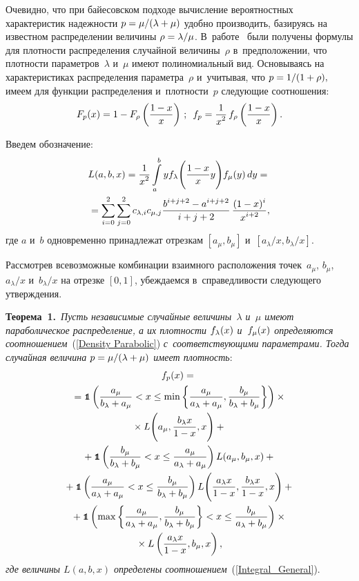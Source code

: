 \begin{multicols}{2}
Очевидно, что при байесовском подходе вы\-чис\-ление вероятностных характеристик 
на\-деж\-ности $p \hm= \mu/{(\lambda+\mu)}$ удобно производить, базируясь на 
известном распределении величины $\rho\hm=\lambda/\mu$. 
В~работе~\cite{K2016} были получены формулы для плотности распределения 
случайной величины~$\rho$ в~предположении, что плотности параметров~$\lambda$ 
и~$\mu$ имеют полиномиальный вид.
Основываясь на характеристиках распределения параметра~$\rho$ и~учитывая, что 
$p \hm=1/(1\hm+\rho),$
имеем для функции распределения и~плот\-ности~$p$ следующие соотношения:
$$
F_p(x)=1-F_\rho\left(\fr{1-x}{x}\right)\,;\enskip 
f_p=\fr{1}{x^2}\,f_\rho\left(\fr{1-x}{x}\right).
$$


Введем обозначение:
\begin{multline}
L(a,b,x)=\fr{1}{x^2} \il{a}{b}{y}\fl\Bigg(\fr{1-x}{x} y\Bigg)\fm(y)\, dy ={}\\
{}=\sum\limits_{i=0}^{2}\sum\limits_{j=0}^{2}c_{\lambda,i}c_{\mu,j}
\fr{b^{i+j+2}-a^{i+j+2}}{i+j+2}\, \fr{(1-x)^i}{x^{i+2}},
\label{Integral_General}
\end{multline}
где $a$ и~$b$ одновременно принадлежат отрезкам $[a_\mu,b_\mu]$ 
и~$[a_\lambda/x,b_\lambda/x]$.

Рассмотрев всевозможные комбинации взаимного расположения точек~$a_\mu$, 
$b_\mu$, $a_\lambda/x$ и~$b_\lambda/x$ на отрезке $[0,1]$, убеждаемся 
в~справедливости следующего утверждения.

\smallskip

\noindent
\textbf{Теорема~1.}\
\textit{Пусть независимые случайные величины~$\lambda$ и~$\mu$ имеют 
параболическое распределение, а их плотности $\fl(x)$ и~$\fm(x)$ 
определяются соотношением}~(\ref{Density Parabolic}) 
\textit{с~соответствующими параметрами.
Тогда случайная величина $p \hm= {{\mu}/{(\lambda+\mu)}}$ имеет плотность}:
\begin{multline*}
f_p(x)={}\\
{}=\Ik\left(\fr{\am}{b_\lambda+\am}<x\le\min\left\{
\fr{\am}{\al+\am},\fr{b_\mu}{b_\lambda+b_\mu}\right\}\right)\times{}\\
{}\times L
\Bigg(\am,\fr{b_\lambda x}{1-x},x\Bigg)+{}\\
{}+\Ik\left(\fr{b_\mu}{b_\lambda+b_\mu}<x\le\fr{\am}{\al+\am}\right)L(\am,b_\mu,x)+{}\\
{}+\Ik\left(\fr{\am}{\al+\am}<x\le\fr{b_\mu}{b_\lambda+b_\mu}\right)L\Bigg(
\fr{\al x}{1-x},\fr{b_\lambda x}{1-x},x\Bigg)+{}\\
{}+\Ik\left(\max\left\{\fr{\am}{\al+\am},\fr{b_\mu}{b_\lambda+b_\mu}\right\}<x\le
\fr{b_\mu}{\al+b_\mu}\right)\times{}\\
{}\times L\left(\fr{\al x}{1-x},b_\mu,x\right),
\end{multline*}
\textit{где величины $L(a,b,x)$ определены соотношением}~(\ref{Integral_General}).


\end{multicols}
